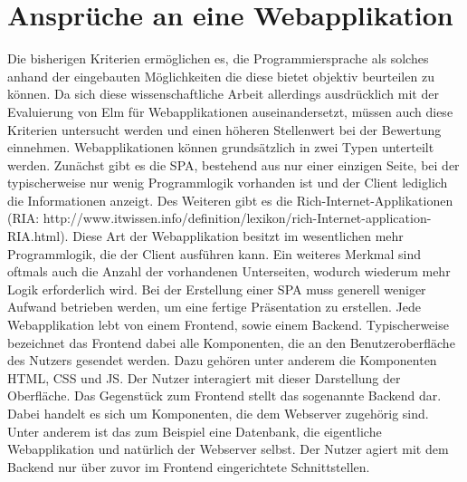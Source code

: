 \section{Ansprüche an eine Webapplikation}
\label{sec:ansprueche-webapp}
Die bisherigen Kriterien ermöglichen es, die Programmiersprache als solches anhand der eingebauten Möglichkeiten die diese bietet objektiv beurteilen zu können. Da sich diese wissenschaftliche Arbeit allerdings ausdrücklich mit der Evaluierung von Elm für Webapplikationen auseinandersetzt, müssen auch diese Kriterien untersucht werden und einen höheren Stellenwert bei der Bewertung einnehmen.
Webapplikationen können grundsätzlich in zwei Typen unterteilt werden. Zunächst gibt es die \ac{SPA}, bestehend aus nur einer einzigen Seite, bei der typischerweise nur wenig  Programmlogik vorhanden ist und der Client lediglich die Informationen anzeigt. Des Weiteren gibt es die Rich-Internet-Applikationen\\
(RIA: http://www.itwissen.info/definition/lexikon/rich-Internet-application-RIA.html). Diese Art der Webapplikation besitzt im wesentlichen mehr Programmlogik, die der Client ausführen kann. Ein weiteres Merkmal sind oftmals auch die Anzahl der vorhandenen Unterseiten, wodurch wiederum mehr Logik erforderlich wird.
Bei der Erstellung einer \ac{SPA} muss generell weniger Aufwand betrieben werden, um eine fertige Präsentation zu erstellen.
Jede Webapplikation lebt von einem Frontend, sowie einem Backend. Typischerweise bezeichnet das Frontend dabei alle Komponenten, die an den Benutzeroberfläche des Nutzers gesendet werden. Dazu gehören unter anderem die Komponenten \ac{HTML}, \ac{CSS} und \ac{JS}. Der Nutzer interagiert mit dieser Darstellung der Oberfläche.
Das Gegenstück zum Frontend stellt das sogenannte Backend dar. Dabei handelt es sich um Komponenten, die dem Webserver zugehörig sind. Unter anderem ist das zum Beispiel eine Datenbank, die eigentliche Webapplikation und natürlich der Webserver selbst. Der Nutzer agiert mit dem Backend nur über zuvor im Frontend eingerichtete Schnittstellen.


